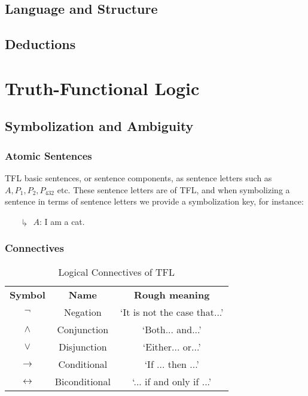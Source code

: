 \documentclass[12pt, a4paper, twoside, openright, titlepage]{book}
\begin{document}
\chapter{\textsection\textsection Language and Structure}


\chapter{\textsection\textsection Deductions}


\part{Truth-Functional Logic}


\chapter{\textsection\textsection Symbolization and Ambiguity}

\section{\textsection Atomic Sentences}

\begin{defn}{}{}
    TFL  basic sentences, or sentence components, as sentence letters such as $A,P_1,P_2,P_{432}$ etc. These sentence letters are  of TFL, and when symbolizing a sentence in terms of sentence letters we provide a symbolization key, for instance:\begin{enumerate}
        \item[$\drsh$] $A$: I am a cat.
    \end{enumerate}
\end{defn}

\section{\textsection Connectives}

\begin{table}[H]
    \centering
    \caption{Logical Connectives of TFL}
    \begin{tabular}{ccc}
        \textbf{Symbol} & \textbf{Name} & \textbf{Rough meaning} \\
        $\lnot$ & Negation & `It is not the case that...' \\
        $\wedge$ & Conjunction & `Both... and...'\\
        $\lor$ & Disjunction & `Either... or...' \\
        $\rightarrow$ & Conditional & `If ... then ...' \\
        $\leftrightarrow$ & Biconditional & `... if and only if ...'
    \end{tabular}
\end{table}
\end{document}
